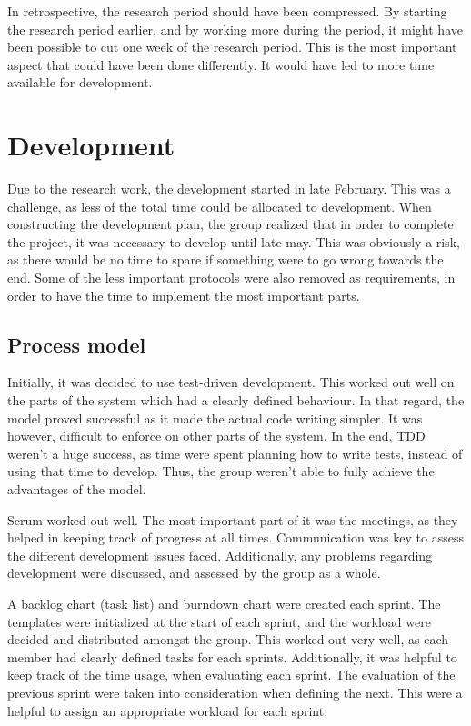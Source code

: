 In retrospective, the research period should have been compressed. By starting the research period earlier, and by working more during the period, it might have been possible to cut one week of the research period. This is the most important aspect that could have been done differently. It would have led to more time available for development.

\section{Development}
\label{sec:project_evaluation-development}

Due to the research work, the development started in late February. This was a challenge, as less of the total time could be allocated to development. When constructing the development plan, the group realized that in order to complete the project, it was necessary to develop until late may. This was obviously a risk, as there would be no time to spare if something were to go wrong towards the end. Some of the less important protocols were also removed as requirements, in order to have the time to implement the most important parts.

\subsection{Process model}
\label{subsec:project_evaluation-development-process_model}

Initially, it was decided to use test-driven development. This worked out well on the parts of the system which had a clearly defined behaviour. In that regard, the model proved successful as it made the actual code writing simpler. It was however, difficult to enforce on other parts of the system. In the end, TDD weren't a huge success, as time were spent planning how to write tests, instead of using that time to develop. Thus, the group weren't able to fully achieve the advantages of the model. 

Scrum worked out well. The most important part of it was the meetings, as they helped in keeping track of progress at all times. Communication was key to assess the different development issues faced. Additionally, any problems regarding development were discussed, and assessed by the group as a whole. 

A backlog chart (task list) and burndown chart were created each sprint. The templates were initialized at the start of each sprint, and the workload were decided and distributed amongst the group. This worked out very well, as each member had clearly defined tasks for each sprints. Additionally, it was helpful to keep track of the time usage, when evaluating each sprint. The evaluation of the previous sprint were taken into consideration when defining the next. This were a helpful to assign an appropriate workload for each sprint.

